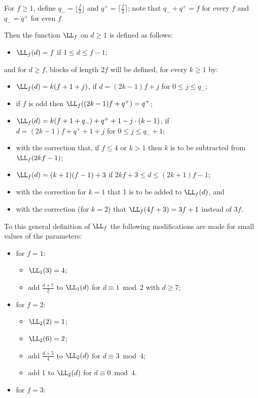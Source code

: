 \begin{definition}\label{def:LL}
For $f\ge 1$, define $q_{-}=\lfloor\frac{f}{2}\rfloor$ and $q^{+}=\lceil\frac{f}{2}\rceil$;
note that $q_{-}+q^{+}=f$ for every $f$ and $q_{-}=q^{+}$ for even $f$.

Then the function  $\LL_{f}$ on
$d\geq 1$ is defined as follows: 
\begin{itemize}
\item[(1)] $\LL_f(d)=f$ if $1\leq d\leq f-1$;
\end{itemize}
and for $d\geq f$, blocks of length $2f$ will be defined,
for every $k\geq 1$ by:
\begin{itemize}
\item[(2)] $\LL_f(d)=k(f+1+j)$, if $d=(2k-1)f+j$ for $0\leq j\leq q_{-}$;
\item[(3)] if $f$ is odd then $\LL_f((2k-1)f+q^{+})=q^{+}$;
\item[(4)] 
$\LL_f(d)=k(f+1+q_{-})+q^{+}+1-j\cdot (k-1)$, if $d=(2k-1)f+q^{+}+1+j$ for $0\leq j\leq q_{-}+1$;
\item[] with the correction that, if $f\leq 4$ or $k>1$ then $k$ 
is to be subtracted from $\LL_f(2kf-1)$;
\item[(5)] $\LL_f(d)=(k+1)(f-1)+3$ if $2kf+3\leq d\leq (2k+1)f-1$;
\item[] with the correction for $k=1$ that 1 is to be added to $\LL_f(d)$, and
\item[] with the correction (for $k=2$) that $\LL_f(4f+3)=3f+1$ instead of $3f$.
\end{itemize}
To this general definition of $\LL_f$ the following
modifications are made for small values of the parameters:
\begin{itemize}
\item for $f=1$:
\begin{itemize}
\item[] $\LL_1(3)=4$;
\item[] add $\frac{d+7}{2}$ to $\LL_1(d)$ for $d\equiv 1\bmod 2$ with $d\geq 7$;
\end{itemize}
\item for $f=2$:
\begin{itemize}
\item[] $\LL_2(2)=1$;
\item[] $\LL_2(6)=2$;
\item[] add $\frac{d+5}{4}$ to $\LL_2(d)$ for $d\equiv 3\bmod 4$;
\item[] add 1 to $\LL_2(d)$ for $d\equiv 0\bmod 4$.
\end{itemize}
\item for $f=3$:

\end{itemize}
\end{definition}
